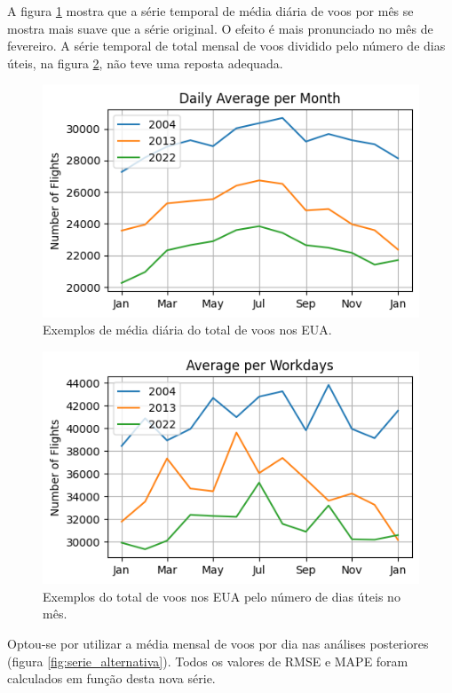 \documentclass[final,5p]{elsarticle}
\numberwithin{equation}{section}
\begin{document}
    A figura \ref{fig:exemplo_media} mostra que a série temporal de média diária de voos por mês se mostra mais suave que a série original. O efeito é mais pronunciado no mês de fevereiro. A série temporal de total mensal de voos dividido pelo número de dias úteis, na figura \ref{fig:exemplo_dais_uteis}, não teve uma reposta adequada.

    \begin{figure}[hbt!]
        \includegraphics[width=0.95\columnwidth]{A_Daily_Average_per_Month.png}
        \caption{Exemplos de média diária do total de voos nos EUA.}
        \label{fig:exemplo_media}
    \end{figure}

    \begin{figure}[hbt!]
        \includegraphics[width=0.95\columnwidth]{A_Average_per_Workdays.png}
        \caption{Exemplos do total de voos nos EUA pelo número de dias úteis no mês.}
        \label{fig:exemplo_dais_uteis}
    \end{figure}

    Optou-se por utilizar a média mensal de voos por dia nas análises posteriores (figura \ref{fig:serie_alternativa}). Todos os valores de RMSE e MAPE foram calculados em função desta nova série.
\end{document}
